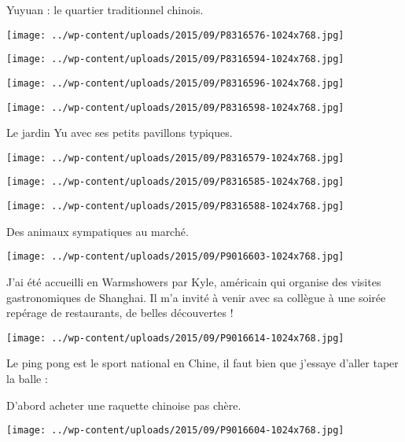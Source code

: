  Yuyuan : le quartier traditionnel chinois.
\begin{center} \texttt{[image: ../wp-content/uploads/2015/09/P8316576-1024x768.jpg]} \end{center}
\begin{center} \texttt{[image: ../wp-content/uploads/2015/09/P8316594-1024x768.jpg]} \end{center}
\begin{center} \texttt{[image: ../wp-content/uploads/2015/09/P8316596-1024x768.jpg]} \end{center}
\begin{center} \texttt{[image: ../wp-content/uploads/2015/09/P8316598-1024x768.jpg]} \end{center}

 Le jardin Yu avec ses petits pavillons typiques.
\begin{center} \texttt{[image: ../wp-content/uploads/2015/09/P8316579-1024x768.jpg]} \end{center}
\begin{center} \texttt{[image: ../wp-content/uploads/2015/09/P8316585-1024x768.jpg]} \end{center}
\begin{center} \texttt{[image: ../wp-content/uploads/2015/09/P8316588-1024x768.jpg]} \end{center}

\pagebreak
 Des animaux sympatiques au marché.
\begin{center} \texttt{[image: ../wp-content/uploads/2015/09/P9016603-1024x768.jpg]} \end{center}

 J'ai été accueilli en Warmshowers par Kyle, américain qui organise des visites gastronomiques de Shanghai. Il m'a invité à venir avec sa collègue à une soirée repérage de restaurants, de belles découvertes ! 
\begin{center} \texttt{[image: ../wp-content/uploads/2015/09/P9016614-1024x768.jpg]} \end{center}

\pagebreak
 Le ping pong est le sport national en Chine, il faut bien que j'essaye d'aller taper la balle : 

 D'abord acheter une raquette chinoise pas chère.
\begin{center} \texttt{[image: ../wp-content/uploads/2015/09/P9016604-1024x768.jpg]} \end{center}

